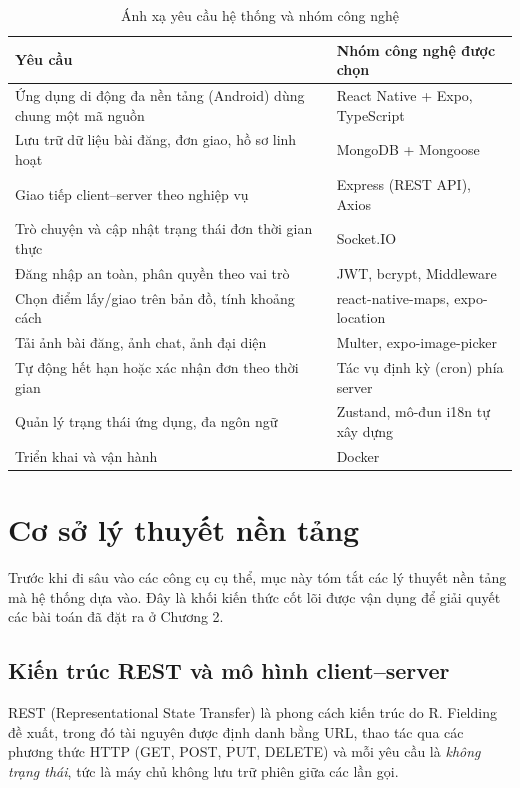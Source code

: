 \documentclass[../main.tex]{subfiles}%
\begin{document}
\begin{table}[H]
\centering
\renewcommand{\arraystretch}{1.5}
\begin{tabular}{|p{8cm}|p{7cm}|}
\hline
\textbf{Yêu cầu} & \textbf{Nhóm công nghệ được chọn} \\ \hline
Ứng dụng di động đa nền tảng (Android) dùng chung một mã nguồn & React Native + Expo, TypeScript \\ \hline
Lưu trữ dữ liệu bài đăng, đơn giao, hồ sơ linh hoạt & MongoDB + Mongoose \\ \hline
Giao tiếp client–server theo nghiệp vụ & Express (REST API), Axios \\ \hline
Trò chuyện và cập nhật trạng thái đơn thời gian thực & Socket.IO \\ \hline
Đăng nhập an toàn, phân quyền theo vai trò & JWT, bcrypt, Middleware \\ \hline
Chọn điểm lấy/giao trên bản đồ, tính khoảng cách & react-native-maps, expo-location \\ \hline
Tải ảnh bài đăng, ảnh chat, ảnh đại diện & Multer, expo-image-picker \\ \hline
Tự động hết hạn hoặc xác nhận đơn theo thời gian & Tác vụ định kỳ (cron) phía server \\ \hline
Quản lý trạng thái ứng dụng, đa ngôn ngữ & Zustand, mô-đun i18n tự xây dựng \\ \hline
Triển khai và vận hành & Docker \\ \hline
\end{tabular}
\caption{Ánh xạ yêu cầu hệ thống và nhóm công nghệ}
\label{tab:anh_xa_yeu_cau}
\end{table}

\section{Cơ sở lý thuyết nền tảng}
Trước khi đi sâu vào các công cụ cụ thể, mục này tóm tắt các lý thuyết nền tảng mà hệ thống dựa vào. Đây là khối kiến thức cốt lõi được vận dụng để giải quyết các bài toán đã đặt ra ở Chương 2.

\subsection{Kiến trúc REST và mô hình client–server}
REST (Representational State Transfer) là phong cách kiến trúc do R. Fielding đề xuất, trong đó tài nguyên được định danh bằng URL, thao tác qua các phương thức HTTP (GET, POST, PUT, DELETE) và mỗi yêu cầu là \textit{không trạng thái}, tức là máy chủ không lưu trữ phiên giữa các lần gọi. 
\end{document}
